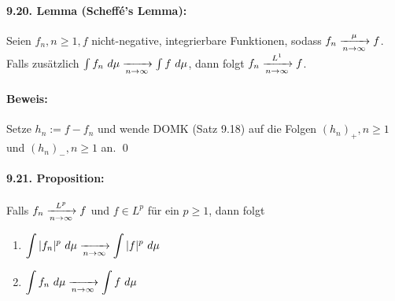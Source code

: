 \paragraph{9.20. Lemma (Scheff\'e's Lemma):}Seien $f_n,n\geq1,f$ nicht-negative, integrierbare Funktionen, sodass $f_n\nto{\mu}{n\to\infty}f$. Falls zus\"atzlich $\int f_n\ d\mu\nto{}{n\to\infty}\int f\ d\mu$, dann folgt $f_n\nto{L^1}{n\to\infty}f$.

\paragraph{Beweis:}Setze $h_n:=f-f_n$ und wende DOMK (Satz 9.18) auf die Folgen $(h_n)_+,n\geq1$ und $(h_n)_-,n\geq1$ an. \qed

\paragraph{9.21. Proposition:}Falls $f_n\nto{L^p}{n\to\infty}f$ und $f\in L^p$ f\"ur ein $p\geq1$, dann folgt
\begin{enumerate}[label=(\roman*)]
    \item $\displaystyle\int|f_n|^p\ d\mu\nto{}{n\to\infty}\int|f|^p\ d\mu$
    \item $\displaystyle\int f_n\ d\mu\nto{}{n\to\infty}\int f\ d\mu$
\end{enumerate} 

